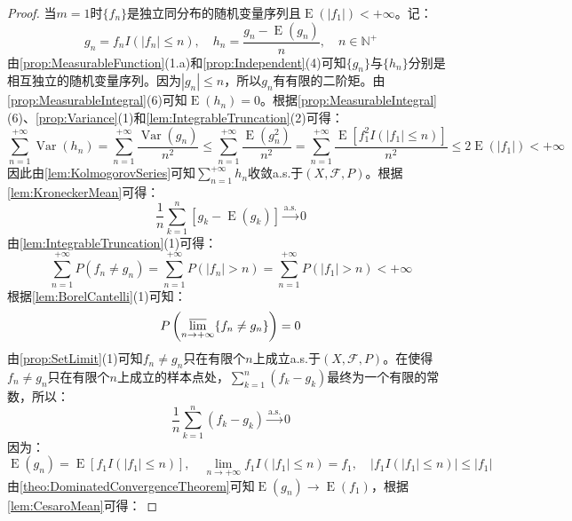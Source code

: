 \begin{proof}
	当$m=1$时$\{f_n\}$是独立同分布的随机变量序列且$\operatorname{E}(|f_1|)<+\infty$。记：
	\begin{equation*}
		g_n=f_nI(|f_n|\leqslant n),\quad h_n=\frac{g_n-\operatorname{E}(g_n)}{n},\quad n\in\mathbb{N}^+
	\end{equation*}
	由\cref{prop:MeasurableFunction}(1.a)和\cref{prop:Independent}(4)可知$\{g_n\}$与$\{h_n\}$分别是相互独立的随机变量序列。因为$|g_n|\leqslant n$，所以$g_n$有有限的二阶矩。由\cref{prop:MeasurableIntegral}(6)可知$\operatorname{E}(h_n)=0$。根据\cref{prop:MeasurableIntegral}(6)、\cref{prop:Variance}(1)和\cref{lem:IntegrableTruncation}(2)可得：
	\begin{equation*}
		\sum_{n=1}^{+\infty}\operatorname{Var}(h_n)=\sum_{n=1}^{+\infty}\frac{\operatorname{Var}(g_n)}{n^2}\leqslant\sum_{n=1}^{+\infty}\frac{\operatorname{E}(g_n^2)}{n^2}=\sum_{n=1}^{+\infty}\frac{\operatorname{E}[f_1^2I(|f_1|\leqslant n)]}{n^2}\leqslant2\operatorname{E}(|f_1|)<+\infty
	\end{equation*}
	因此由\cref{lem:KolmogorovSeries}可知$\sum\limits_{n=1}^{+\infty}h_n$收敛a.s.于$(X,\mathscr{F},P)$。根据\cref{lem:KroneckerMean}可得：
	\begin{equation*}
		\frac{1}{n}\sum_{k=1}^{n}[g_k-\operatorname{E}(g_k)]\overset{\text{a.s.}}{\longrightarrow}0
	\end{equation*}
	由\cref{lem:IntegrableTruncation}(1)可得：
	\begin{equation*}
		\sum_{n=1}^{+\infty}P(f_n\ne g_n)=\sum_{n=1}^{+\infty}P(|f_n|>n)=\sum_{n=1}^{+\infty}P(|f_1|>n)<+\infty
	\end{equation*}
	根据\cref{lem:BorelCantelli}(1)可知：
	\begin{equation*}
		P\left(\varlimsup_{n\to+\infty}\{f_n\ne g_n\}\right)=0
	\end{equation*}
	由\cref{prop:SetLimit}(1)可知$f_n\ne g_n$只在有限个$n$上成立a.s.于$(X,\mathscr{F},P)$。在使得$f_n\ne g_n$只在有限个$n$上成立的样本点处，$\sum\limits_{k=1}^{n}(f_k-g_k)$最终为一个有限的常数，所以：
	\begin{equation*}
		\frac{1}{n}\sum_{k=1}^{n}(f_k-g_k)\overset{\text{a.s.}}{\longrightarrow}0
	\end{equation*}
	因为：
	\begin{equation*}
		\operatorname{E}(g_n)=\operatorname{E}[f_1I(|f_1|\leqslant n)],\quad\lim_{n\to+\infty}f_1I(|f_1|\leqslant n)=f_1,\quad|f_1I(|f_1|\leqslant n)|\leqslant|f_1|
	\end{equation*}
	由\cref{theo:DominatedConvergenceTheorem}可知$\operatorname{E}(g_n)\to\operatorname{E}(f_1)$，根据\cref{lem:CesaroMean}可得：

\end{proof}
